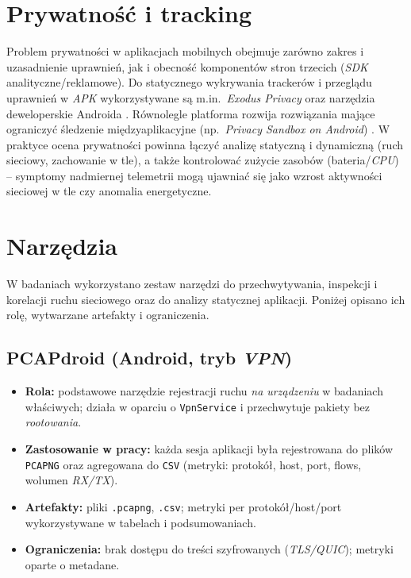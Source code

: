\section{Prywatność i tracking}
Problem prywatności w aplikacjach mobilnych obejmuje zarówno zakres i uzasadnienie uprawnień, jak i obecność komponentów stron trzecich (\emph{SDK} analityczne/reklamowe). Do statycznego wykrywania trackerów i przeglądu uprawnień w \emph{APK} wykorzystywane są m.in.\ \textit{Exodus Privacy} oraz narzędzia deweloperskie Androida \cite{ExodusPrivacy,AndroidPermissionsOverview}. Równolegle platforma rozwija rozwiązania mające ograniczyć śledzenie międzyaplikacyjne (np.\ \emph{Privacy Sandbox on Android}) \cite{PrivacySandboxAndroid}. W praktyce ocena prywatności powinna łączyć analizę statyczną i dynamiczną (ruch sieciowy, zachowanie w tle), a także kontrolować zużycie zasobów (bateria/\emph{CPU}) – symptomy nadmiernej telemetrii mogą ujawniać się jako wzrost aktywności sieciowej w tle czy anomalia energetyczne.

\section{Narzędzia}

W badaniach wykorzystano zestaw narzędzi do przechwytywania, inspekcji i korelacji ruchu sieciowego oraz do analizy statycznej aplikacji. Poniżej opisano ich rolę, wytwarzane artefakty i ograniczenia.

\subsection*{PCAPdroid (Android, tryb \emph{VPN})}
\begin{itemize}
  \item \textbf{Rola:} podstawowe narzędzie rejestracji ruchu \emph{na urządzeniu} w badaniach właściwych; działa w oparciu o \texttt{VpnService} i przechwytuje pakiety bez \emph{rootowania}.
  \item \textbf{Zastosowanie w pracy:} każda sesja aplikacji była rejestrowana do plików \texttt{PCAPNG} oraz agregowana do \texttt{CSV} (metryki: protokół, host, port, flows, wolumen \emph{RX/TX}).
  \item \textbf{Artefakty:} pliki \texttt{.pcapng}, \texttt{.csv}; metryki per protokół/host/port wykorzystywane w tabelach i podsumowaniach.
  \item \textbf{Ograniczenia:} brak dostępu do treści szyfrowanych (\emph{TLS/QUIC}); metryki oparte o metadane.
\end{itemize}

